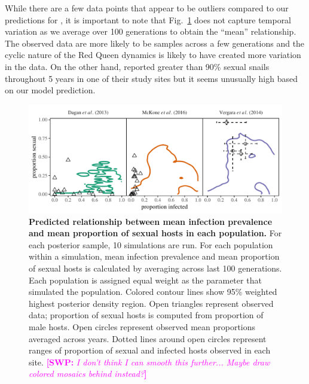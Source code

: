 \documentclass{article}\usepackage[]{graphicx}\usepackage[]{color}
\newcommand{\comment}[3]{\textcolor{#1}{\textbf{[#2: }\textit{#3}\textbf{]}}}
\newcommand{\swp}[1]{\comment{magenta}{SWP}{#1}}
\newcommand{\fref}[1]{Fig.~\ref{fig:#1}}
\begin{document}
While there are a few data points that appear to be outliers compared to our predictions for \cite{vergara2014infection},
it is important to note that \fref{ivs} does not capture temporal variation as we average over 100 generations to obtain the ``mean'' relationship.
The observed data are more likely to be samples across a few generations and the cyclic nature of the Red Queen dynamics is likely to have created more variation in the data.
On the other hand, \cite{vergara2014infection} reported greater than 90\% sexual snails throughout 5 years in one of their study sites but it seems unusually high based on our model prediction.

\begin{figure}[!ht]
\includegraphics[width=\textwidth]{../fig/simulated_data.pdf}
\caption{{\bf Predicted relationship between mean infection prevalence and mean proportion of sexual hosts in each population.}
For each posterior sample, 10 simulations are run.
For each population within a simulation, mean infection prevalence and mean proportion of sexual hosts is calculated by averaging across last 100 generations. 
Each population is assigned equal weight as the parameter that simulated the population.
Colored contour lines show 95\% weighted highest posterior density region.
Open triangles represent observed data; proportion of sexual hosts is computed from proportion of male hosts.
Open circles represent observed mean proportions averaged across years. Dotted lines around open circles represent ranges of proportion of sexual and infected hosts observed in each site.
\swp{I don't think I can smooth this further... Maybe draw colored mosaics behind instead?}
}
\label{fig:ivs}
\end{figure}
\end{document}
